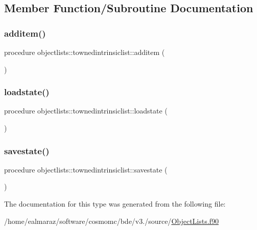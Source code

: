 \subsection{Member Function/\+Subroutine Documentation}
\mbox{\label{structobjectlists_1_1townedintrinsiclist_ac616ea95f35132baa09b76e043fb951c}} 
\subsubsection{\texorpdfstring{additem()}{additem()}}
{\footnotesize\ttfamily procedure objectlists\+::townedintrinsiclist\+::additem (\begin{DoxyParamCaption}{ }\end{DoxyParamCaption})\hspace{0.3cm}{\ttfamily [private]}}

\mbox{\label{structobjectlists_1_1townedintrinsiclist_aae658f97d6726b929a394a0c8f4bc6bf}} 
\subsubsection{\texorpdfstring{loadstate()}{loadstate()}}
{\footnotesize\ttfamily procedure objectlists\+::townedintrinsiclist\+::loadstate (\begin{DoxyParamCaption}{ }\end{DoxyParamCaption})\hspace{0.3cm}{\ttfamily [private]}}

\mbox{\label{structobjectlists_1_1townedintrinsiclist_a9a82c57bfe6c687851c65c0a354e0be0}} 
\subsubsection{\texorpdfstring{savestate()}{savestate()}}
{\footnotesize\ttfamily procedure objectlists\+::townedintrinsiclist\+::savestate (\begin{DoxyParamCaption}{ }\end{DoxyParamCaption})\hspace{0.3cm}{\ttfamily [private]}}



The documentation for this type was generated from the following file\+:\begin{DoxyCompactItemize}
\item 
/home/ealmaraz/software/cosmomc/bde/v3./source/\mbox{\hyperlink{ObjectLists_8f90}{Object\+Lists.\+f90}}\end{DoxyCompactItemize}
